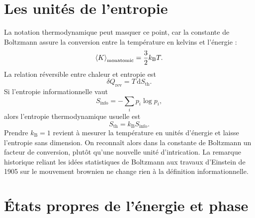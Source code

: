 \section{Les unités de l’entropie}

\begin{classroomqa}
\end{classroomqa}

La notation thermodynamique peut masquer ce point, car la constante de Boltzmann assure la conversion entre la température en kelvins et l’énergie :
\begin{equation}
\left\langle K\right\rangle_{\mathrm{monatomic}}
=\frac32 k_{\mathrm B}T.
\end{equation}
La relation réversible entre chaleur et entropie est
\begin{equation}
\delta Q_{\mathrm{rev}}=T\,\mathrm dS_{\mathrm{th}}.
\end{equation}
Si l’entropie informationnelle vaut
\begin{equation}
S_{\mathrm{info}}=-\sum_i p_i\log p_i,
\end{equation}
alors l’entropie thermodynamique usuelle est
\begin{equation}
S_{\mathrm{th}}=k_{\mathrm B}S_{\mathrm{info}}.
\end{equation}
Prendre \(k_{\mathrm B}=1\) revient à mesurer la température en unités d’énergie et laisse l’entropie sans dimension. On reconnaît alors dans la constante de Boltzmann un facteur de conversion, plutôt qu’une nouvelle unité d’intrication. La remarque historique reliant les idées statistiques de Boltzmann aux travaux d’Einstein de 1905 sur le mouvement brownien ne change rien à la définition informationnelle.

\section{États propres de l’énergie et phase}

\begin{classroomqa}
\end{classroomqa}

